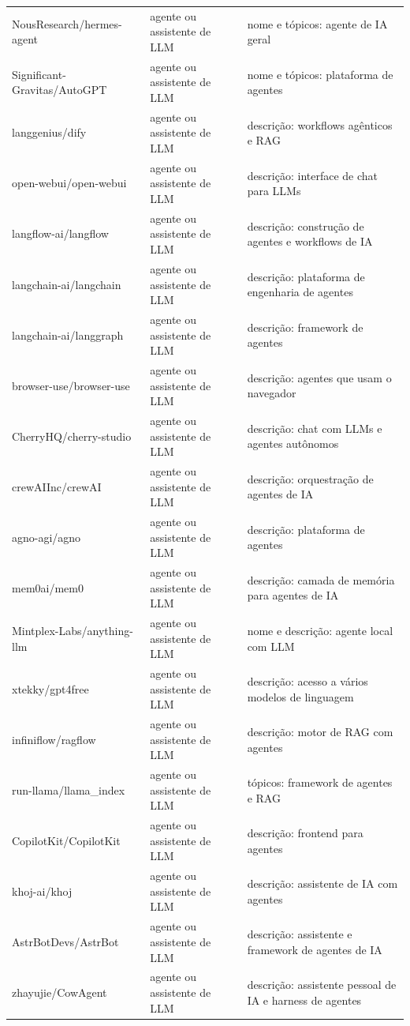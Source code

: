 \begin{tabular}{lll}
NousResearch/hermes-agent & agente ou assistente de LLM & nome e tópicos: agente de IA geral \\
Significant-Gravitas/AutoGPT & agente ou assistente de LLM & nome e tópicos: plataforma de agentes \\
langgenius/dify & agente ou assistente de LLM & descrição: workflows agênticos e RAG \\
open-webui/open-webui & agente ou assistente de LLM & descrição: interface de chat para LLMs \\
langflow-ai/langflow & agente ou assistente de LLM & descrição: construção de agentes e workflows de IA \\
langchain-ai/langchain & agente ou assistente de LLM & descrição: plataforma de engenharia de agentes \\
langchain-ai/langgraph & agente ou assistente de LLM & descrição: framework de agentes \\
browser-use/browser-use & agente ou assistente de LLM & descrição: agentes que usam o navegador \\
CherryHQ/cherry-studio & agente ou assistente de LLM & descrição: chat com LLMs e agentes autônomos \\
crewAIInc/crewAI & agente ou assistente de LLM & descrição: orquestração de agentes de IA \\
agno-agi/agno & agente ou assistente de LLM & descrição: plataforma de agentes \\
mem0ai/mem0 & agente ou assistente de LLM & descrição: camada de memória para agentes de IA \\
Mintplex-Labs/anything-llm & agente ou assistente de LLM & nome e descrição: agente local com LLM \\
xtekky/gpt4free & agente ou assistente de LLM & descrição: acesso a vários modelos de linguagem \\
infiniflow/ragflow & agente ou assistente de LLM & descrição: motor de RAG com agentes \\
run-llama/llama_index & agente ou assistente de LLM & tópicos: framework de agentes e RAG \\
CopilotKit/CopilotKit & agente ou assistente de LLM & descrição: frontend para agentes \\
khoj-ai/khoj & agente ou assistente de LLM & descrição: assistente de IA com agentes \\
AstrBotDevs/AstrBot & agente ou assistente de LLM & descrição: assistente e framework de agentes de IA \\
zhayujie/CowAgent & agente ou assistente de LLM & descrição: assistente pessoal de IA e harness de agentes \\

\end{tabular}

